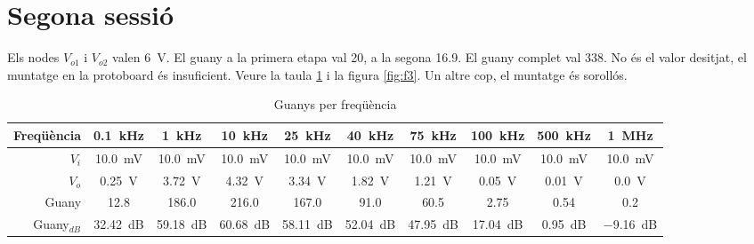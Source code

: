 \documentclass[catalan, a4paper, nobib]{tufte-handout}
\begin{document}
\newpage

\part{Segona sessió}

 Els nodes $V_{o1}$ i $V_{o2}$ valen \qty{6}{\volt}.
 El guany a la primera etapa val \num{20}, a la segona \num{16.9}. El guany complet val \num{338}. No és el valor desitjat, el muntatge en la protoboard és insuficient.
 Veure la taula \ref{tab:t3} i la figura \ref{fig:f3}. Un altre cop, el muntatge és sorollós.

\begin{table}[h]
  \begin{center}
    \begin{tabular}{@{}rccccccccc@{}}
      \toprule
      Freqüència & \qty{0.1}{\kilo\hertz} & \qty{1}{\kilo\hertz} & \qty{10}{\kilo\hertz} & \qty{25}{\kilo\hertz} & \qty{40}{\kilo\hertz} & \qty{75}{\kilo\hertz} & \qty{100}{\kilo\hertz} & \qty{500}{\kilo\hertz} & \qty{1}{\mega\hertz} \\
      \midrule
      $V_i$ & \qty{10.0}{\milli\volt} & \qty{10.0}{\milli\volt} & \qty{10.0}{\milli\volt} & \qty{10.0}{\milli\volt} & \qty{10.0}{\milli\volt} & \qty{10.0}{\milli\volt} & \qty{10.0}{\milli\volt} & \qty{10.0}{\milli\volt} & \qty{10.0}{\milli\volt} \\
      \midrule
      $V_o$ & \qty{0.25}{\volt} & \qty{3.72}{\volt} & \qty{4.32}{\volt} & \qty{3.34}{\volt} & \qty{1.82}{\volt} & \qty{1.21}{\volt} & \qty{0.05}{\volt} & \qty{0.01}{\volt} & \qty{0.0}{\volt} \\
      \midrule
      Guany & \num{12.8} & \num{186.0} & \num{216.0} & \num{167.0} & \num{91.0} & \num{60.5} & \num{2.75} & \num{0.54} & \num{0.2} \\
      \midrule
      Guany${}_{dB}$ & \qty{32.42}{\deci\bel} & \qty{59.18}{\deci\bel} & \qty{60.68}{\deci\bel} & \qty{58.11}{\deci\bel} & \qty{52.04}{\deci\bel} & \qty{47.95}{\deci\bel} & \qty{17.04}{\deci\bel} & \qty{0.95}{\deci\bel} & \qty{-9.16}{\deci\bel} \\
      \bottomrule
    \end{tabular}
  \end{center}
  \caption{Guanys per freqüència}
  \label{tab:t3}
\end{table}
\end{document}
